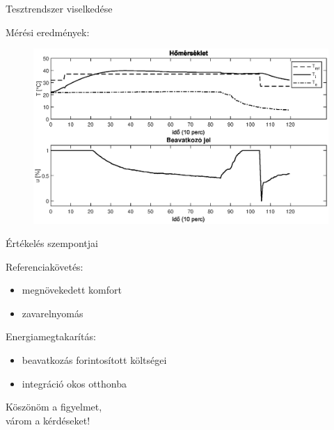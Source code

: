 \documentclass[14pt,handout]{beamer}
\begin{document}
\begin{frame}{Tesztrendszer viselkedése}

Mérési eredmények:

\begin{figure}
	\centering
	\includegraphics[width=\textwidth]{picture/4-step.eps}	
\end{figure}

\end{frame}



\begin{frame}{Értékelés szempontjai}

	Referenciakövetés:
	\begin{itemize}
		\item megnövekedett komfort
		\item zavarelnyomás
	\end{itemize}
	\vspace{6pt}
	
	Energiamegtakarítás:
	\begin{itemize}
		\item beavatkozás forintosított költségei
		\item integráció okos otthonba
	\end{itemize}
\end{frame}

%
%	
%

\begin{frame}{}
	\begin{center}
		\vspace{18pt}
		\large
		{ 
			Köszönöm a figyelmet, \\
			várom a kérdéseket!
		}
	\end{center}
\end{frame}
\end{document}

